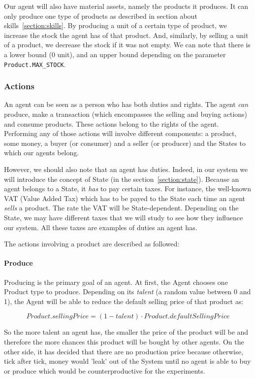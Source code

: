     Our agent will also have material assets, namely the products it produces. It can only produce one type of products as described in section about skills~\ref{section:skills}. By producing a unit of a certain type of product, we increase the stock the agent has of that product. And, similarly, by selling a unit of a product, we decrease the stock if it was not empty. We can note that there is a lower bound (0 unit), and an upper bound depending on the parameter \texttt{Product.MAX\_STOCK}.


    \subsubsection{Actions}\label{section:actions}
    An agent can be seen as a person who has both duties and rights. The agent \emph{can} produce, make a transaction (which encompasses the selling and buying actions) and consume products. These actions belong to the rights of the agent. Performing any of those actions will involve different components: a product, some money, a buyer (or consumer) and a seller (or producer) and the States to which our agents belong. 

    However, we should also note that an agent has duties. Indeed, in our system we will introduce the concept of State (in the section~\ref{section:state}). Because an agent belongs to a State, it \emph{has} to pay certain taxes. 
    For instance, the well-known VAT (Value Added Tax) which has to be payed to the State each time an agent \emph{sells} a product. The rate the VAT will be State-dependent. Depending on the State, we may have different taxes that we will study to see how they influence our system. All these taxes are examples of duties an agent has. 

    The actions involving a product are described as followed:

    \paragraph{Produce}
    Producing is the primary goal of an agent. At first, the Agent chooses one Product type to produce. Depending on its \emph{talent} (a random value between 0 and 1), the Agent will be able to reduce the default selling price of that product as: 

    $$Product.sellingPrice = (1-talent) \cdot Product.defaultSellingPrice$$

    So the more talent an agent has, the smaller the price of the product will be and therefore the more chances this product will be bought by other agents. On the other side, it has decided that there are no production price because otherwise, tick after tick, money would 'leak' out of the System until no agent is able to buy or produce which would be counterproductive for the experiments.

